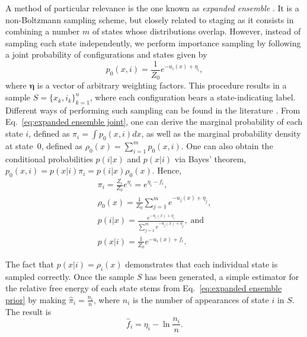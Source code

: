 \documentclass[journal=jctcce,manuscript=article,layout=twocolumn]{achemso}
\newcommand{\vt}[1]{\boldsymbol{\mathbf{#1}}}   %
\begin{document}
A method of particular relevance is the one known as \textit{expanded ensemble} \cite{Lyubartsev_1992}. It is a non-Boltzmann sampling scheme, but closely related to staging as it consists in combining a number $m$ of states whose distributions overlap. However, instead of sampling each state independently, we perform importance sampling by following a joint probability of configurations and states given by \cite{Nymeyer_2010}
\begin{equation}
\label{eq:expanded ensemble joint}
p_0(x, i) = \frac{1}{Z_0} e^{-u_i(x) + \eta_i},
\end{equation}
where $\vt \eta$ is a vector of arbitrary weighting factors. This procedure results in a sample $S = \{x_k,i_k\}_{k=1}^n$, where each configuration bears a state-indicating label. Different ways of performing such sampling can be found in the literature \cite{Lyubartsev_1992, Nymeyer_2010, Christ_2007, Christ_2008, Christ_2009, Katzgraber_2006, Trebst_2006, Escobedo_2007, Escobedo_2008, Martinez_2008, Chodera_2011_2, Ding_2017}. From Eq.~\eqref{eq:expanded ensemble joint}, one can derive the marginal probability of each state $i$, defined as $\pi_i = \int p_0(x,i)dx$, as well as the marginal probability density at state~$0$, defined as $\rho_0(x) = \sum_{i=1}^m p_0(x,i)$. One can also obtain the conditional probabilities $p(i|x)$ and $p(x|i)$ via Bayes' theorem, $p_0(x,i) = p(x|i) \pi_i = p(i|x) \rho_0(x)$. Hence,
\begin{subequations}
	\label{eq:expanded ensemble probabilities}
	\begin{gather}
	\pi_i = \frac{Z_i}{Z_0} e^{\eta_i} = e^{\eta_i - f_i}, \label{eq:expanded ensemble prior} \\
	\rho_0(x) = \frac{1}{Z_0} \sum_{j=1}^m e^{-u_j(x) + \eta_j}, \label{eq:expanded ensemble evidence} \\
	p(i|x) = \frac{e^{-u_i(x) + \eta_i}}{\sum_{j=1}^m e^{-u_j(x) + \eta_j}}, \; \text{and} \label{eq:expanded ensemble posterior} \\
	p(x|i) = \frac{1}{Z_0} e^{-u_i(x) + f_i}. \label{eq:expanded ensemble likelihood}
	\end{gather}
\end{subequations}

The fact that $p(x|i) = \rho_i(x)$ demonstrates that each individual state is sampled correctly. Once the sample $S$ has been generated, a simple estimator for the relative free energy of each state stems from Eq.~\eqref{eq:expanded ensemble prior} by making $\hat \pi_i = \frac{n_i}{n}$, where $n_i$ is the number of appearances of state $i$ in $S$. The result is
\begin{equation}
\label{eq:expanded ensemble histogram estimator}
\hat f_i = \eta_i - \ln \frac{n_i}{n}.
\end{equation}
\end{document}
